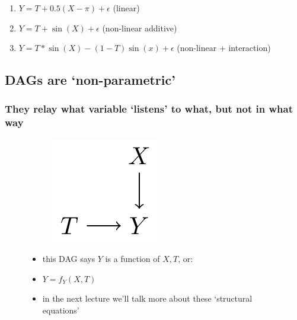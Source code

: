 \documentclass[
  letterpaper,
  DIV=11,
  numbers=noendperiod]{scrartcl}
\providecommand{\tightlist}{%
  \setlength{\itemsep}{0pt}\setlength{\parskip}{0pt}}\usepackage{longtable,booktabs,array}
\begin{document}
\begin{enumerate}
\def\labelenumi{\arabic{enumi}.}
\tightlist
\item
  \(Y = T + 0.5 (X - \pi) + \epsilon\) (linear)
\item
  \(Y = T + \sin(X) + \epsilon\) (non-linear additive)
\item
  \(Y = T * \sin(X) - (1-T) \sin(x) + \epsilon\) (non-linear +
  interaction)
\end{enumerate}

\subsection{DAGs are `non-parametric'}\label{dags-are-non-parametric-1}

\subsubsection{They relay what variable `listens' to what, but not in
what
way}\label{they-relay-what-variable-listens-to-what-but-not-in-what-way-1}

\begin{figure}

\begin{minipage}{0.30\linewidth}

\begin{figure}[H]

{\centering \includegraphics{_tikzs/dag-nonparametric.png}

}


\end{figure}%

\end{minipage}%
%
\begin{minipage}{0.70\linewidth}

\begin{itemize}
\tightlist
\item
  this DAG says \(Y\) is a function of \(X,T\), or:
\item
  \(Y = f_Y(X,T)\)
\item
  in the next lecture we'll talk more about these `structural equations'
\end{itemize}

\end{minipage}%

\end{figure}%
\end{document}

